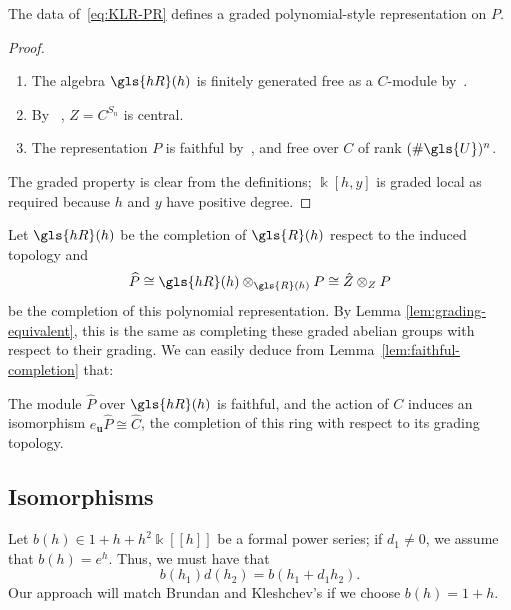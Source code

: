 \documentclass[ALCO,ThmDefs,Unicode,epreuves]{cedram}
\newcommand{\K}{\Bbbk}%
\newcommand{\Bu}{\mathbf{u}}
\newcommand{\hR}{\gls{hR}}
\newcommand{\hP}{\widehat{P}}
\newcommand\llbracket{[\![}
\newcommand\rrbracket{]\!]}
\begin{document}
\begin{lemma}
 The data of~\eqref{eq:KLR-PR} defines a graded polynomial-style
 representation on $P$. 
\end{lemma}
\begin{proof}\mbox{}
 \begin{enumerate}
 \item The algebra $\hR(h)$ is finitely generated free as a
$C$-module by~\cite[Cor.~2.10]{KLI}. 
 \item By
~\cite[Thm.~2.9]{KLI}, $Z=C^{S_n} $ is central.
 \item The representation $P$ is faithful by~\cite[Cor.~2.6]{KLI},
 and free over $C$ of rank $(\# \gls{U})^n$. 
 \end{enumerate}
 The graded property is clear from the definitions; $\K[h,y]$ is
 graded local as required because $h$ and $y$ have positive degree.
 \end{proof}
Let $\hR(h)$ be the completion of $\gls{R}(h)$
respect to the induced topology and \[\hP\cong
\hR(h)\otimes_{\gls{R}(h)}P\cong \hat{Z}\otimes_{Z} P\]
be the completion of this polynomial representation. By Lemma
\ref{lem:grading-equivalent}, this is the same as completing these
graded abelian groups with respect to their grading. We can easily
deduce from Lemma~\ref{lem:faithful-completion} that:
\begin{lemma}\label{lem:KLR-P}
The module $\hP$ over $\hR(h)$ is faithful, and the action of $C$ induces an isomorphism $e_{\Bu}\hP\cong \widehat{C}$, the completion of
this ring with respect to its grading topology. 
\end{lemma}

\subsection{Isomorphisms}
Let $b(h)\in 1+h+h^2\K\llbracket h\rrbracket $ be a formal power series; if $d_1\neq 0$, we
assume that $b(h)=e^h$. Thus, we must have that
\begin{equation}
b(h_1)d(h_2)=b(h_1+d_1h_2). \label{eq:b-d}
\end{equation}
Our approach will match Brundan and Kleshchev's if we choose
$b(h)=1+h$. 
\end{document}
